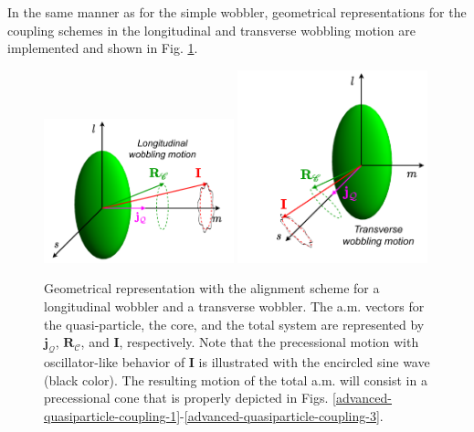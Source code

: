 In the same manner as for the simple wobbler, geometrical representations for the coupling schemes in the longitudinal and transverse wobbling motion are implemented and shown in Fig. \ref{wobbling-oddA-geometry}.
\begin{figure}
    \centering
    \includegraphics[width=0.49\textwidth]{Chapters/Figures/longitudinal_wobbler-schematic.pdf}
    \includegraphics[width=0.49\textwidth]{Chapters/Figures/transverse_wobbler-schematic.pdf}
    \caption{Geometrical representation with the alignment scheme for a longitudinal wobbler and a transverse wobbler. The a.m. vectors for the quasi-particle, the core, and the total system are represented by $\mathbf{j}_\mathcal{Q}$, $\mathbf{R}_\mathscr{C}$, and $\mathbf{I}$, respectively. Note that the precessional motion with oscillator-like behavior of $\mathbf{I}$ is illustrated with the encircled sine wave (black color). The resulting motion of the total a.m. will consist in a precessional cone that is properly depicted in Figs. \ref{advanced-quasiparticle-coupling-1}-\ref{advanced-quasiparticle-coupling-3}.}
    \label{wobbling-oddA-geometry}
\end{figure}
